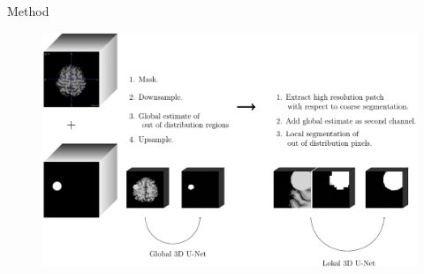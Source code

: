 \documentclass[10pt,aspectratio=169]{beamer}
\begin{document}
\begin{frame}{Method}
\begin{figure}
	\centering
	\includegraphics[width=.78\columnwidth]{_figs/method-cropped.pdf}
\end{figure}
\end{frame}
\end{document}
